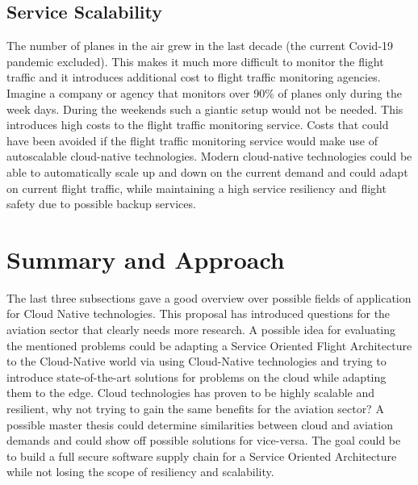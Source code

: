 \documentclass[conference]{IEEEtran}
\begin{document}
\subsection{Service Scalability}
The number of planes in the air grew in the last decade (the current Covid-19 pandemic excluded).
This makes it much more difficult to monitor the flight traffic and it introduces additional
cost to flight traffic monitoring agencies. Imagine a company or agency that monitors over
90\% of planes only during the week days. During the weekends such a giantic setup would not be needed.
This introduces high costs to the flight traffic monitoring service. Costs that could have been 
avoided if the flight traffic monitoring service would make use of autoscalable cloud-native technologies.
Modern cloud-native technologies could be able to automatically scale up and down on the current
demand and could adapt on current flight traffic, while maintaining a high service resiliency
and flight safety due to possible backup services.

\section*{Summary and Approach}
The last three subsections gave a good overview over possible fields of application
for Cloud Native technologies. This proposal has introduced questions for the aviation
sector that clearly needs more research. A possible idea for evaluating the mentioned
problems could be adapting a Service Oriented Flight Architecture to the Cloud-Native
world via using Cloud-Native technologies and trying to introduce state-of-the-art 
solutions for problems on the cloud while adapting them to the edge. Cloud technologies
has proven to be highly scalable and resilient, why not trying to gain the same benefits
for the aviation sector? A possible master thesis could determine similarities between
cloud and aviation demands and could show off possible solutions for vice-versa.
The goal could be to build a full secure software supply chain for a Service Oriented
Architecture while not losing the scope of resiliency and scalability.
\nocite{*}
\printbibliography[]{}
\end{document}
